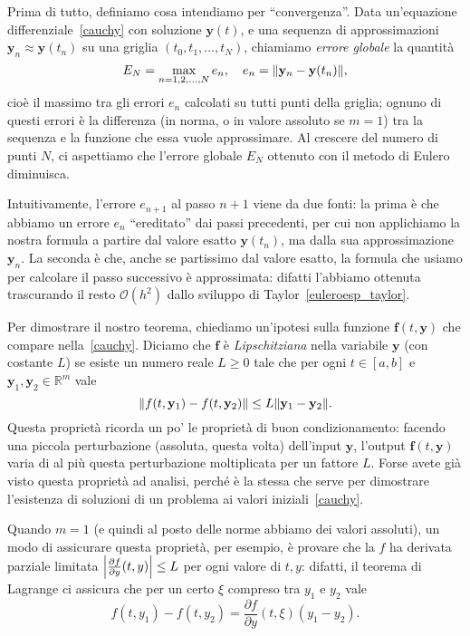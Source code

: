 \documentclass[a4paper]{report}
\DeclarePairedDelimiter{\abs}{\lvert}{\rvert}
\DeclarePairedDelimiter{\norm}{\lVert}{\rVert}
\theoremstyle{definiton}
\theoremstyle{remark}
\newcommand{\y}{\mathbf{y}}
\newcommand{\f}{\mathbf{f}}
\begin{document}
Prima di tutto, definiamo cosa intendiamo per ``convergenza''. Data un'equazione differenziale~\eqref{cauchy} con soluzione $\y(t)$, e una sequenza di approssimazioni $\y_n \approx \y(t_n)$ su una griglia $(t_0,t_1,\dots,t_N)$, chiamiamo \emph{errore globale} la quantità
\begin{equation} \label{globalerror}
    E_N = \max_{n=1,2,\dots,N} e_n, \quad e_n = \norm{\y_n - \y(t_n)},
\end{equation}
cioè il massimo tra gli errori $e_n$ calcolati su tutti punti della griglia; ognuno di questi errori è la differenza (in norma, o in valore assoluto se $m=1$) tra la sequenza e la funzione che essa vuole approssimare. Al crescere del numero di punti $N$, ci aspettiamo che l'errore globale $E_N$ ottenuto con il metodo di Eulero diminuisca.

Intuitivamente, l'errore $e_{n+1}$ al passo $n+1$ viene da due fonti: la prima è che abbiamo un errore $e_n$ ``ereditato'' dai passi precedenti, per cui non applichiamo la nostra formula a partire dal valore esatto $\y(t_n)$, ma dalla sua approssimazione $\y_n$. La seconda è che, anche se partissimo dal valore esatto, la formula che usiamo per calcolare il passo successivo è approssimata: difatti l'abbiamo ottenuta trascurando il resto $\mathcal{O}(h^2)$ dallo sviluppo di Taylor~\eqref{euleroesp_taylor}.

Per dimostrare il nostro teorema, chiediamo un'ipotesi sulla funzione $\f(t,\y)$ che compare nella~\ref{cauchy}. Diciamo che $\f$ è \emph{Lipschitziana} nella variabile $\y$ (con costante $L$) se esiste un numero reale $L \geq 0$ tale che per ogni $t\in [a,b]$ e $\y_1,\y_2\in\mathbb{R}^m$ vale
\[
\norm{f(t, \y_1) - f(t, \y_2)} \leq L\norm{\y_1 - \y_2}.
\]
Questa proprietà ricorda un po' le proprietà di buon condizionamento: facendo una piccola perturbazione (assoluta, questa volta) dell'input $\y$, l'output $\f(t,\y)$ varia di al più questa perturbazione moltiplicata per un fattore $L$. Forse avete già visto questa proprietà ad analisi, perché è la stessa che serve per dimostrare l'esistenza di soluzioni di un problema ai valori iniziali~\eqref{cauchy}.

Quando $m=1$ (e quindi al posto delle norme abbiamo dei valori assoluti), un modo di assicurare questa proprietà, per esempio, è provare che la $f$ ha derivata parziale limitata $\abs*{\frac{\partial f}{\partial y}(t,y)} \leq L$ per ogni valore di $t,y$: difatti, il teorema di Lagrange ci assicura che per un certo $\xi$ compreso tra $y_1$ e $y_2$ vale
\[
f(t, y_1) - f(t, y_2) = \frac{\partial f}{\partial y}(t,\xi) (y_1 - y_2).
\]
\end{document}
